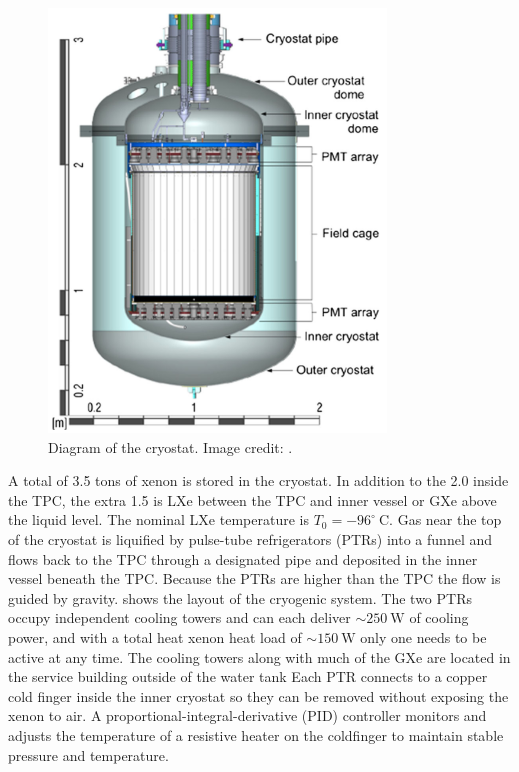\begin{figure}
\centering
\includegraphics[width=0.8\textwidth]{CryostatDiagram}
\caption{Diagram of the cryostat.  Image credit: .}
\label{fig:xenon1t_cryo_cryostat_diagram}
\end{figure}

A total of 3.5 tons of xenon is stored in the cryostat.  In addition to the 2.0 inside the TPC, the extra 1.5 is LXe between the
TPC and inner vessel or GXe above the liquid level.  The nominal LXe temperature is $T_{0} = -96^{\circ}\ \mathrm{C}$.  Gas near the top of
the cryostat is liquified by pulse-tube refrigerators (PTRs) into a funnel and flows back to the TPC through a designated pipe and
deposited in the inner vessel beneath the TPC.  Because
the PTRs are higher than the TPC the flow is guided by gravity.   shows the layout of the
cryogenic
system.  The two PTRs occupy independent cooling towers and can each deliver ${\sim} 250\ \mathrm{W}$ of cooling power, and with
a total heat xenon heat load of ${\sim} 150\ \mathrm{W}$ only one needs to be active at any time.  The cooling towers along with much of
the
GXe are located in the service building outside of the water tank  Each PTR connects to a copper cold finger
inside the inner cryostat so they can be removed without exposing the xenon to air.  A proportional-integral-derivative (PID) controller
monitors and adjusts the temperature of a resistive heater on the coldfinger to maintain stable pressure and temperature.

